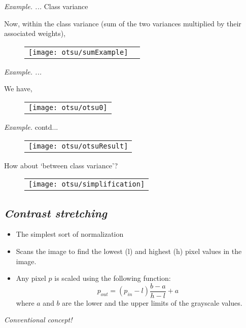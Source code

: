 \documentclass{response}
\begin{document}
{\newpage
\textit{Example. ...}
{\huge Class variance}
\bigskip


Now, within the class variance (sum of the two variances multiplied by their associated weights),
 
 
\begin{figure}[hbp]
\centering
\begin{tabular}{ll}
\texttt{[image: otsu/sumExample]}
\end{tabular}
\end{figure}


\newpage
\textit{Example. ...}



We have, 
\begin{figure}[hpb]
\centering
\begin{tabular}{l}
\texttt{[image: otsu/otsu0]}
\end{tabular}
\end{figure}


\newpage
\textit{Example.} contd...
 
\begin{figure}[hbp]
\centering
\begin{tabular}{l}
\texttt{[image: otsu/otsuResult]}
\end{tabular}
\end{figure}



\newpage

{\huge How about `between class variance'?}
 \bigskip
 
\begin{figure}[hbp]
\centering
\begin{tabular}{l}
\texttt{[image: otsu/simplification]}
\end{tabular}
\end{figure}

{\color{red}{Your work: compute inter class variance for all other thresholds: 0, 1, 2, 4, 5.}}

}



\newpage

\subsection*{\Huge\em Contrast  stretching}
\bigskip


{\large 

\begin{itemize}\setlength\itemsep{-0.5em}
\item The simplest sort of normalization 
\item Scans the image to find the lowest (l) and highest (h) pixel values in the image. 

\item Any pixel $p$ is scaled using the following function:
\[
p_{\mathit{out}} = (p_{\mathit{in}} - l) \frac{b-a}{h-l} + a     
\]
where $a$ and $b$ are the lower and the upper limits of the grayscale values.
\end{itemize}
\vfill

{\huge \em Conventional concept!}
}
\end{document}
